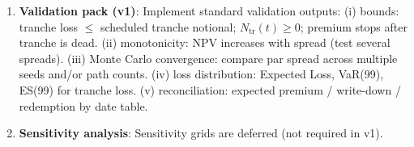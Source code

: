 \documentclass[11pt]{article}
\begin{document}
\begin{enumerate}[label=\arabic*),leftmargin=*,align=left]
\item \textbf{Validation pack (v1)}: Implement standard validation outputs:
(i) bounds: tranche loss $\le$ scheduled tranche notional; $N_{\text{tr}}(t) \ge 0$; premium stops after tranche is dead.
(ii) monotonicity: NPV increases with spread (test several spreads).
(iii) Monte Carlo convergence: compare par spread across multiple seeds and/or path counts.
(iv) loss distribution: Expected Loss, VaR(99), ES(99) for tranche loss.
(v) reconciliation: expected premium / write-down / redemption by date table.

\item \textbf{Sensitivity analysis}: Sensitivity grids are deferred (not required in v1).
\end{enumerate}
\end{document}

